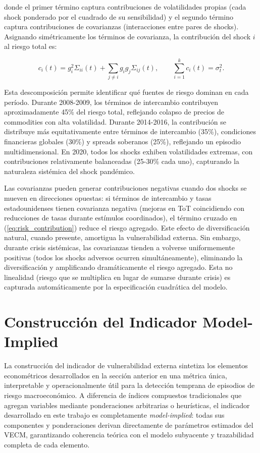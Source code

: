 \documentclass[3p,11pt,draft,natbib=false]{elsarticle}
\begin{document}
donde el primer término captura contribuciones de volatilidades propias (cada shock ponderado por el cuadrado de su sensibilidad) y el segundo término captura contribuciones de covarianzas (interacciones entre pares de shocks). Asignando simétricamente los términos de covarianza, la contribución del shock $i$ al riesgo total es:

\begin{equation}
c_i(t) = g_i^2 \Sigma_{ii}(t) + \sum_{j \neq i} g_i g_j \Sigma_{ij}(t), \qquad \sum_{i=1}^{k} c_i(t) = \sigma_t^2.
\label{eq:risk_contribution}
\end{equation}

Esta descomposición permite identificar qué fuentes de riesgo dominan en cada período. Durante 2008-2009, los términos de intercambio contribuyen aproximadamente 45\% del riesgo total, reflejando colapso de precios de commodities con alta volatilidad. Durante 2014-2016, la contribución se distribuye más equitativamente entre términos de intercambio (35\%), condiciones financieras globales (30\%) y spreads soberanos (25\%), reflejando un episodio multidimensional. En 2020, todos los shocks exhiben volatilidades extremas, con contribuciones relativamente balanceadas (25-30\% cada uno), capturando la naturaleza sistémica del shock pandémico.

Las covarianzas pueden generar contribuciones negativas cuando dos shocks se mueven en direcciones opuestas: si términos de intercambio y tasas estadounidenses tienen covarianza negativa (mejoras en ToT coincidiendo con reducciones de tasas durante estímulos coordinados), el término cruzado en (\ref{eq:risk_contribution}) reduce el riesgo agregado. Este efecto de diversificación natural, cuando presente, amortigua la vulnerabilidad externa. Sin embargo, durante crisis sistémicas, las covarianzas tienden a volverse uniformemente positivas (todos los shocks adversos ocurren simultáneamente), eliminando la diversificación y amplificando dramáticamente el riesgo agregado. Esta no linealidad (riesgo que se multiplica en lugar de sumarse durante crisis) es capturada automáticamente por la especificación cuadrática del modelo.

\section{Construcción del Indicador Model-Implied}
\label{sec:indicador}

La construcción del indicador de vulnerabilidad externa sintetiza los elementos econométricos desarrollados en la sección anterior en una métrica única, interpretable y operacionalmente útil para la detección temprana de episodios de riesgo macroeconómico. A diferencia de índices compuestos tradicionales que agregan variables mediante ponderaciones arbitrarias o heurísticas, el indicador desarrollado en este trabajo es completamente \emph{model-implied}: todas sus componentes y ponderaciones derivan directamente de parámetros estimados del VECM, garantizando coherencia teórica con el modelo subyacente y trazabilidad completa de cada elemento.
\end{document}
